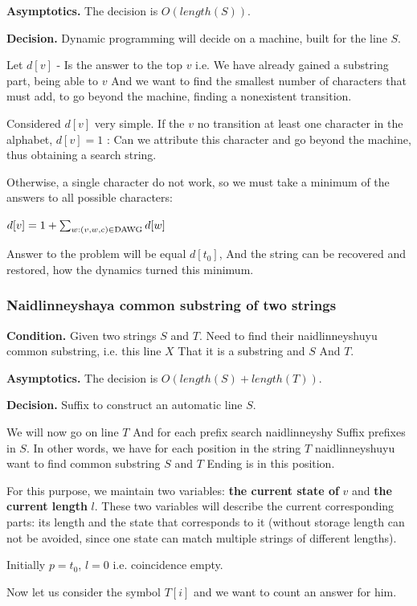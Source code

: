 \textbf{Asymptotics.} The decision is $O (length (S))$.

\textbf{Decision.} Dynamic programming will decide on a machine, built for the line $S$.

Let $d [v]$ - Is the answer to the top $v$ i.e. We have already gained a substring part, being able to $v$ And we want to find the smallest number of characters that must add, to go beyond the machine, finding a nonexistent transition.

Considered $d [v]$ very simple. If the $v$ no transition at least one character in the alphabet, $d [v] = 1$ : Can we attribute this character and go beyond the machine, thus obtaining a search string.

Otherwise, a single character do not work, so we must take a minimum of the answers to all possible characters:

$d[v]=1+\sum_{w:
(v,w,c)\in{\rm DAWG}}d[w]$

Answer to the problem will be equal $d [t_0]$, And the string can be recovered and restored, how the dynamics turned this minimum.

\subsubsection{ Naidlinneyshaya common substring of two strings }

\textbf{Condition.} Given two strings $S$ and $T$. Need to find their naidlinneyshuyu common substring, i.e. this line $X$ That it is a substring and $S$ And $T$.

\textbf{Asymptotics.} The decision is $O (length (S) + length (T))$.

\textbf{Decision.} Suffix to construct an automatic line $S$.

We will now go on line $T$ And for each prefix search naidlinneyshy Suffix prefixes in $S$. In other words, we have for each position in the string $T$ naidlinneyshuyu want to find common substring $S$ and $T$ Ending is in this position.

For this purpose, we maintain two variables: \textbf{the current state of} $v$ and \textbf{the current length} $l$. These two variables will describe the current corresponding parts: its length and the state that corresponds to it (without storage length can not be avoided, since one state can match multiple strings of different lengths).

Initially $p = t_0$, $l = 0$ i.e. coincidence empty.

Now let us consider the symbol $T [i]$ and we want to count an answer for him.

